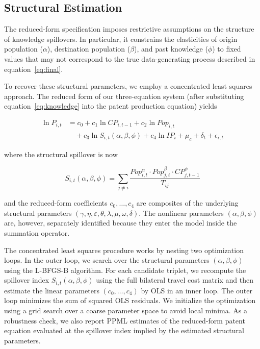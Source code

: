 \documentclass[letterpaper,12pt,leqno]{article}
\begin{document}
\subsection{Structural Estimation}

The reduced-form specification imposes restrictive assumptions on the structure of knowledge spillovers. In particular, it constrains the elasticities of origin population (\(\alpha\)), destination population (\(\beta\)), and past knowledge (\(\phi\)) to fixed values that may not correspond to the true data-generating process described in equation~\eqref{eq:final}.

To recover these structural parameters, we employ a concentrated least squares approach. The reduced form of our three-equation system (after substituting equation~\eqref{eq:knowledge} into the patent production equation) yields

\begin{equation}
  \label{eq:structural_reduced}
  \begin{split}
    \ln P_{i,t} &= c_0 + c_1 \ln CP_{i,t-1} + c_2 \ln Pop_{i,t} \\
    &\quad + c_3 \ln S_{i,t}(\alpha, \beta, \phi) + c_4 \ln IP_i + \mu_c + \delta_t + \epsilon_{i,t}
  \end{split}
\end{equation}

\noindent where the structural spillover is now

\begin{equation}
  \label{eq:structural_spillover}
  S_{i,t}(\alpha, \beta, \phi) = \sum_{j \neq i} \frac{Pop_{i,t}^{\alpha} \cdot Pop_{j,t}^{\beta} \cdot CP_{j,t-1}^{\phi}}{T_{ij}}
\end{equation}

\noindent and the reduced-form coefficients \(c_0, \ldots, c_4\) are composites of the underlying structural parameters \((\gamma, \eta, \varepsilon, \theta, \lambda, \mu, \omega, \delta)\). The nonlinear parameters \((\alpha, \beta, \phi)\) are, however, separately identified because they enter the model inside the summation operator.

The concentrated least squares procedure works by nesting two optimization loops. In the outer loop, we search over the structural parameters \((\alpha, \beta, \phi)\) using the L-BFGS-B algorithm. For each candidate triplet, we recompute the spillover index \(S_{i,t}(\alpha, \beta, \phi)\) using the full bilateral travel cost matrix and then estimate the linear parameters \((c_0, \ldots, c_4)\) by OLS in an inner loop. The outer loop minimizes the sum of squared OLS residuals. We initialize the optimization using a grid search over a coarse parameter space to avoid local minima. As a robustness check, we also report PPML estimates of the reduced-form patent equation evaluated at the spillover index implied by the estimated structural parameters.
\end{document}
